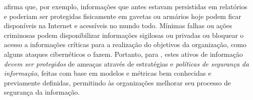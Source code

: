  afirma que, por exemplo, informações que antes estavam persistidas em relatórios e poderiam ser protegidas fisicamente em gavetas ou armários hoje podem ficar disponíveis na Internet e acessíveis no mundo todo. Mínimas falhas ou ações criminosas podem disponibilizar informações sigilosas ou privadas ou bloquear o acesso a informações críticas para a realização do objetivos da organização, como alguns ataques cibernéticos o fazem. Portanto, para , estes ativos de informação \textit{devem ser protegidos} de ameaças através de estratégias e \textit{políticas de segurança  da  informação},  feitas com  base  em  modelos  e  métricas bem  conhecidas e previamente definidas, permitindo  às  organizações  melhorar  seu processo de segurança da informação.

%
%
%
%

